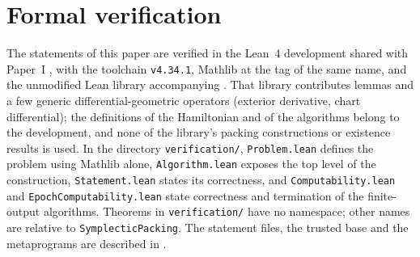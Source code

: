 \section{Formal verification}\label{p2:sec-ver}
\begingroup\sloppy

The statements of this paper are verified in the Lean~4 development shared with Paper~I \cite{LeanRepo,Lean4}, with the
toolchain \texttt{v4.34.1}, Mathlib \cite{Mathlib2020} at the tag of the same name, and the unmodified Lean library
accompanying \cite{OpenAI2026}. That library contributes lemmas and a few generic differential-geometric operators
(exterior derivative, chart differential); the definitions of the Hamiltonian and of the algorithms belong to the
development, and none of the library's packing constructions or existence results is used. In the directory
\texttt{verification/}, \texttt{Problem.lean} defines the problem using Mathlib alone, \texttt{Algorithm.lean} exposes
the top level of the construction, \texttt{Statement.lean} states its correctness, and \texttt{Computability.lean} and
\texttt{EpochComputability.lean} state correctness and termination of the finite-output algorithms. Theorems in \texttt{verification/} have no
namespace; other names are relative to \texttt{SymplecticPacking}. The statement files, the trusted base and the
metaprograms are described in .

